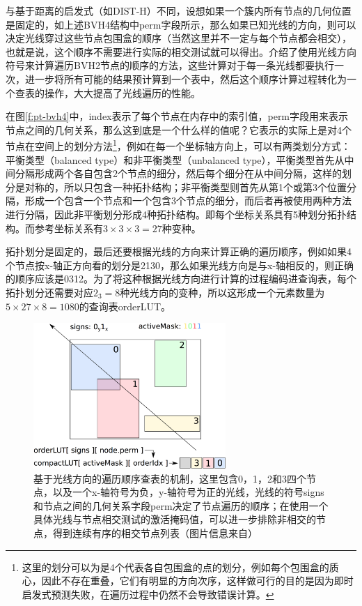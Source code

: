 与基于距离的启发式（如DIST-H）不同，设想如果一个簇内所有节点的几何位置是固定的，如上述BVH4结构中perm字段所示，那么如果已知光线的方向，则可以决定光线穿过这些节点包围盒的顺序（当然这里并不一定与每个节点都会相交），也就是说，这个顺序不需要进行实际的相交测试就可以得出。\cite{a:RayTracingDeformableScenesUsingDynamicBoundingVolumeHierarchies}介绍了使用光线方向符号来计算遍历BVH2节点的顺序的方法，这些计算对于每一条光线都要执行一次，\cite{a:EfficientRayTracingKernelsforModernCPUArchitectures}进一步将所有可能的结果预计算到一个表中，然后这个顺序计算过程转化为一个查表的操作，大大提高了光线遍历的性能。

在图\ref{f:pt-bvh4}中，index表示了每个节点在内存中的索引值，perm字段用来表示节点之间的几何关系，那么这到底是一个什么样的值呢？它表示的实际上是对4个节点在空间上的划分方法\footnote{这里的划分可以为是4个代表各自包围盒的点的划分，例如每个包围盒的质心，因此不存在重叠，它们有明显的方向次序，这样做可行的目的是因为即时启发式预测失败，在遍历过程中仍然不会导致错误计算。}，例如在每一个坐标轴方向上，可以有两类划分方式：平衡类型（balanced type）和非平衡类型（unbalanced type），平衡类型首先从中间分隔形成两个各自包含2个节点的细分，然后每个细分在从中间分隔，这样的划分是对称的，所以只包含一种拓扑结构；非平衡类型则首先从第1个或第3个位置分隔，形成一个包含一个节点和一个包含3个节点的细分，而后者再被使用两种方法进行分隔，因此非平衡划分形成4种拓扑结构。即每个坐标关系具有5种划分拓扑结构。而参考坐标关系有$3\times 3\times 3=27$种变种。

拓扑划分是固定的，最后还要根据光线的方向来计算正确的遍历顺序，例如如果4个节点按x-轴正方向看的划分是2130，那么如果光线方向是与x-轴相反的，则正确的顺序应该是0312。为了将这种根据光线方向进行计算的过程编码进查询表，每个拓扑划分还需要对应$2_{3}=8$种光线方向的变种，所以这形成一个元素数量为$5\times 27 \times 8=1080$的查询表orderLUT。

\begin{figure}
	\sidecaption
	\includegraphics[width=0.65\textwidth]{figures/pt/ordered-traversal}
	\caption{基于光线方向的遍历顺序查表的机制，这里包含0，1，2和3四个节点，以及一个x-轴符号为负，y-轴符号为正的光线，光线的符号signs和节点之间的几何关系字段perm决定了节点遍历的顺序；在使用一个具体光线与节点相交测试的激活掩码值，可以进一步排除非相交的节点，得到连续有序的相交节点列表（图片信息来自\cite{a:EfficientRayTracingKernelsforModernCPUArchitectures}）}
	\label{f:pt-ordered-traversal}
\end{figure}

